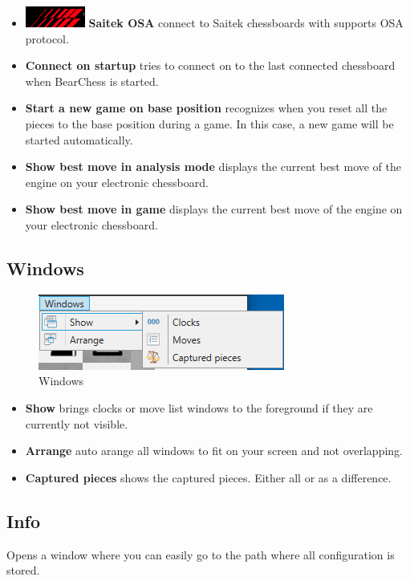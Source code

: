 \documentclass[11pt,a4paper]{article}
\begin{document}
\begin{itemize}
\item  \includegraphics[scale=0.4]{Saitek_logo.PNG} \textbf{Saitek OSA} connect to Saitek chessboards with supports OSA protocol.		
	\item \textbf{Connect on startup} tries to connect on to the last connected chessboard when BearChess is started. 	
	\item \textbf{Start a new game on base position} recognizes when you reset all the pieces to the base position during a game. In this case, a new game will be started automatically.
	\item \textbf{Show best move in analysis mode} displays the current best move of the engine on your electronic chessboard.
	\item \textbf{Show best move in game} displays the current best move of the engine on your electronic chessboard.	
\end{itemize}

\subsection{Windows}
\begin{figure}[H]
	\centering
	\includegraphics[scale=1.0]{Windows.png}
	\caption{Windows}
	\label{fig:Windows}
\end{figure}
\begin{itemize}
	\item \textbf{Show} brings clocks or move list windows to the foreground if they are currently not visible.
	\item \textbf{Arrange} auto arange all windows to fit on your screen and not overlapping.
	\item \textbf{Captured pieces} shows the captured pieces. Either all or as a difference. 
\end{itemize}

\subsection{Info}
Opens a window where you can easily go to the path where all configuration is stored.
\end{document}
